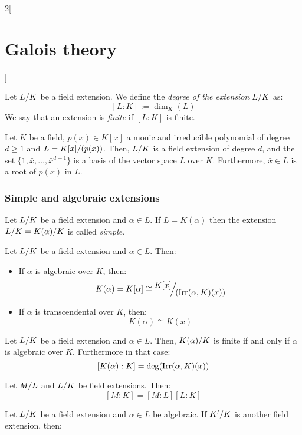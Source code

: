 \documentclass[../../../main.tex]{subfiles}
\begin{document}
\begin{multicols}{2}[\section{Galois theory}]
\begin{prop}
  \end{prop}
  \begin{definition}
    Let $\quot{L}{K}$ be a field extension. We define the \textit{degree of the extension $\quot{L}{K}$} as: $$[L:K]:=\dim_K(L)$$ We say that an extension is \textit{finite} if $[L:K]$ is finite.
  \end{definition}
  \begin{prop}
    Let $K$ be a field, $p(x)\in K[x]$ a monic and irreducible polynomial of degree $d\geq 1$ and $L=\quot{K[x]}{(p(x))}$. Then, $\quot{L}{K}$ is a field extension of degree $d$, and the set $\{1,\bar{x},\ldots,\bar{x}^{d-1}\}$ is a basis of the vector space $L$ over $K$. Furthermore, $\bar{x}\in L$ is a root of $p(x)$ in $L$.
  \end{prop}
  \subsubsection*{Simple and algebraic extensions}
  \begin{definition}
    Let $\quot{L}{K}$ be a field extension and $\alpha\in L$. If $L=K(\alpha)$ then the extension $\quot{L}{K}=\quot{K(\alpha)}{K}$ is called \textit{simple}.
  \end{definition}
  \begin{prop}
    Let $\quot{L}{K}$ be a field extension and $\alpha\in L$. Then:
    \begin{itemize}
      \item If $\alpha$ is algebraic over $K$, then: $$K(\alpha)=K[\alpha]\cong\quot{K[x]}{(\irr(\alpha,K)(x))}$$
      \item If $\alpha$ is transcendental over $K$, then: $$K(\alpha)\cong K(x)$$
    \end{itemize}
  \end{prop}
  \begin{corollary}
    Let $\quot{L}{K}$ be a field extension and $\alpha\in L$. Then, $\quot{K(\alpha)}{K}$ is finite if and only if $\alpha$ is algebraic over $K$. Furthermore in that case: $$[K(\alpha):K]=\deg(\operatorname{Irr}(\alpha,K)(x))$$
  \end{corollary}
  \begin{theorem}
    Let $\quot{M}{L}$ and $\quot{L}{K}$ be field extensions. Then: $$[M:K]=[M:L][L:K]$$
  \end{theorem}
  \begin{prop}
    Let $\quot{L}{K}$ be a field extension and $\alpha\in L$ be algebraic. If $\quot{K'}{K}$ is another field extension, then:
    \begin{enumerate}

\end{enumerate}
\end{prop}
\end{multicols}
\end{document}
